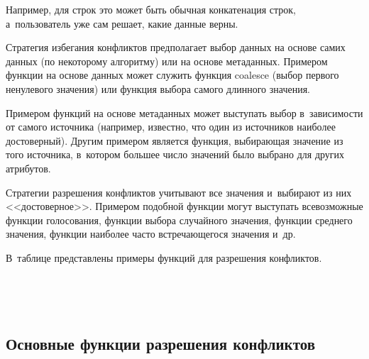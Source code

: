 \begin{multicols}{2}

\noindent
 Например, для строк это может быть обычная конкатенация строк,
а~пользователь уже сам решает, какие данные верны.

  Стратегия избегания конфликтов предполагает выбор данных на основе самих данных (по
некоторому алгоритму) или на основе метаданных. Примером функции на основе данных
может служить функция coalesce (выбор первого ненулевого значения) или функция выбора
самого длинного значения.

Примером функций на основе метаданных может выступать
выбор в~зависимости от самого источника (например, известно, что один из источников
наиболее достоверный). Другим примером является функция, выбирающая значение из того
источника, в~котором большее число значений было выбрано для других атрибутов.



  Стратегии разрешения конфликтов учитывают все значения и~выбирают из них
<<достоверное>>. Примером подобной функции могут выступать всевозможные функции
голосования, функции выбора случайного значения, функции среднего значения, функции
наиболее часто встречающегося значения и~др.

  В~таблице представлены примеры функций для разрешения конфликтов.

  \begin{figure*}[b] %
  \vspace*{1pt}
 \begin{center}
 \mbox{%
 \epsfxsize=120.997mm
 }
 \end{center}
 \vspace*{-9pt}
  \vspace*{1pt}
 \begin{center}
 \mbox{%
 \epsfxsize=120.997mm
 }
 \end{center}
 \vspace*{-9pt}
  \end{figure*}

\vspace*{-6pt}

  \subsection{Основные функции разрешения конфликтов}


\end{multicols}
